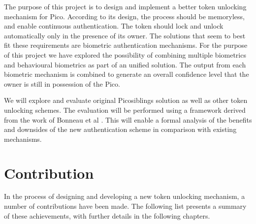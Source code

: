 The purpose of this project is to design and implement a better token unlocking mechanism for Pico. According to its design, the process should be memoryless, and enable continuous authentication. The token should lock and unlock automatically only in the presence of its owner. The solutions that seem to best fit these requirements are biometric authentication mechanisms. For the purpose of this project we have explored the possibility of combining multiple biometrics and behavioural biometrics as part of an unified solution. The output from each biometric mechanism is combined to generate an overall confidence level that the owner is still in possession of the Pico.

We will explore and evaluate original Picosiblings solution as well as other token unlocking schemes. The evaluation will be performed using a framework derived from the work of Bonneau et al \cite{bonneau2012quest}. This will enable a formal analysis of the benefits and downsides of the new authentication scheme in comparison with existing mechanisms. 

\section{Contribution}
In the process of designing and developing a new token unlocking mechanism, a number of contributions have been made. The following list presents a summary of these achievements, with further details in the following chapters.

